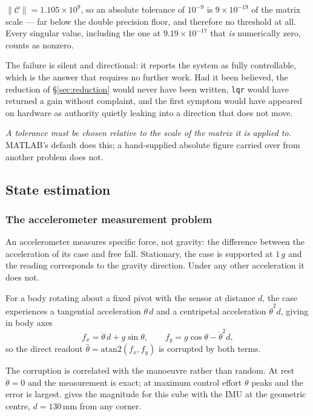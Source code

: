\noindent
$\lVert\mathcal{C}\rVert = 1.105\times10^{9}$, so an absolute tolerance of
$10^{-9}$ is $9\times10^{-19}$ of the matrix scale --- far below the double
precision floor, and therefore no threshold at all. Every singular value,
including the one at $9.19\times10^{-17}$ that \emph{is} numerically zero,
counts as nonzero.

The failure is silent and directional: it reports the system as fully
controllable, which is the answer that requires no further work. Had it been
believed, the reduction of \S\ref{sec:reduction} would never have been
written, \texttt{lqr} would have returned a gain without complaint, and the
first symptom would have appeared on hardware as authority quietly leaking
into a direction that does not move.

\emph{A tolerance must be chosen relative to the scale of the matrix it is
applied to.} MATLAB's default does this; a hand-supplied absolute figure
carried over from another problem does not.

\subsection{State estimation}
\label{sec:estimation}

\subsubsection{The accelerometer measurement problem}
\label{sec:why-estimator}

An accelerometer measures specific force, not gravity: the difference between
the acceleration of its case and free fall. Stationary, the case is supported
at $1\,g$ and the reading corresponds to the gravity direction. Under any
other acceleration it does not.

For a body rotating about a fixed pivot with the sensor at distance $d$, the
case experiences a tangential acceleration $\ddot\theta\,d$ and a centripetal
acceleration $\dot\theta^2 d$, giving in body axes
%
\begin{equation}
  f_x = \ddot\theta\,d + g\sin\theta,
  \qquad
  f_y = g\cos\theta - \dot\theta^2 d,
  \label{eq:specific-force}
\end{equation}
%
so the direct readout $\hat\theta = \mathrm{atan2}(f_x, f_y)$ is corrupted by
both terms.

The corruption is correlated with the manoeuvre rather than random. At rest
$\ddot\theta = 0$ and the measurement is exact; at maximum control effort
$\ddot\theta$ peaks and the error is largest.  gives the
magnitude for this cube with the IMU at the geometric centre, $d = 130$\,mm
from any corner.


